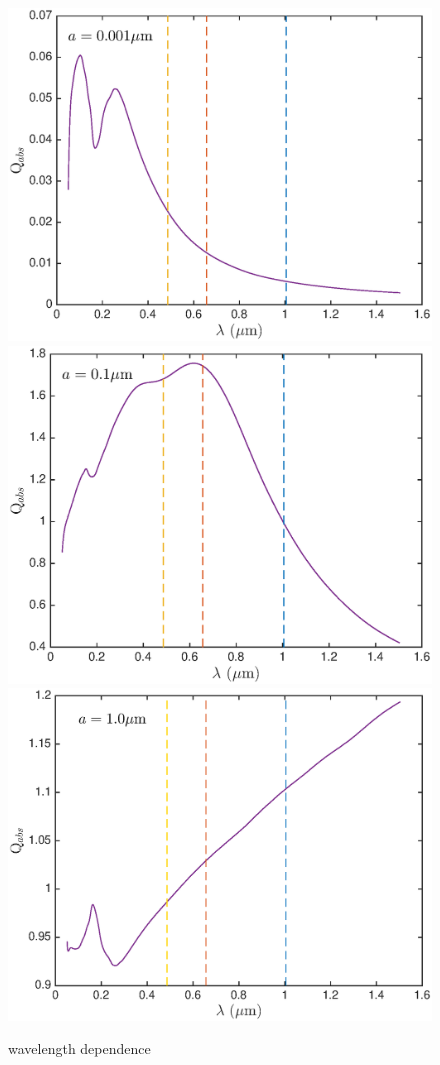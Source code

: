\documentclass[useAMS,usenatbib,usegraphicx]{mnras}
\begin{document}
\begin{figure}
\includegraphics[trim =30 10 45 15,clip=true,scale=0.35]{Qabs_a0_001}
\includegraphics[trim =51 10 45 15,clip=true,scale=0.35]{Qabs_a0_1}
\includegraphics[trim =48 10 45 15,clip=true,scale=0.35]{Qabs_a1_0}
\caption{wavelength dependence}
\label{wav_dep}
\end{figure}
\end{document}
